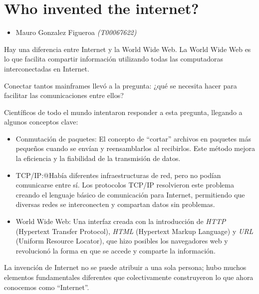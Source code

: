 \documentclass[letterpaper, 12pt]{article}
\begin{document}
\section*{Who invented the internet?}

\begin{itemize}[label=$\triangleright$]
    \item Mauro Gonzalez Figueroa \textit{(T00067622)}
\end{itemize}

\nocite{*}

Hay una diferencia entre Internet y la World Wide Web. La World Wide Web es lo
que facilita compartir información utilizando todas las computadoras
interconectadas en Internet.

Conectar tantos mainframes llevó a la pregunta: ¿qué se necesita hacer para
facilitar las comunicaciones entre ellos?

Científicos de todo el mundo intentaron responder a esta pregunta, llegando a
algunos conceptos clave:

\begin{itemize}
    \item Conmutación de paquetes: El concepto de ``cortar'' archivos en paquetes más
          pequeños cuando se envían y reensamblarlos al recibirlos. Este método mejora la
          eficiencia y la fiabilidad de la transmisión de datos.
    \item TCP/IP:@{}Había diferentes infraestructuras de red, pero no podían comunicarse
          entre sí. Los protocolos TCP/IP resolvieron este problema creando el lenguaje
          básico de comunicación para Internet, permitiendo que diversas redes se
          interconecten y compartan datos sin problemas.
    \item World Wide Web: Una interfaz creada con la introducción de \textit{HTTP}
          (Hypertext Transfer Protocol), \textit{HTML} (Hypertext Markup Language) y
          \textit{URL} (Uniform Resource Locator), que hizo posibles los navegadores web
          y revolucionó la forma en que se accede y comparte la información.
\end{itemize}

La invención de Internet no se puede atribuir a una sola persona; hubo muchos
elementos fundamentales diferentes que colectivamente construyeron lo que ahora
conocemos como ``Internet''.

\printbibliography
\end{document}
